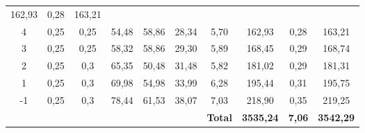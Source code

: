 \documentclass[letterpaper,11pt]{article} %
\begin{document}
\begin{itemize}
\begin{table}[H]
{\begin{tabular}{cccccc|c|c|c|c|}
              162,93 &
              0,28 &
              163,21
              \\
            \multicolumn{1}{|c|}{4} &
              \multicolumn{1}{c|}{0,25} &
              \multicolumn{1}{c|}{0,25} &
              \multicolumn{1}{c|}{54,48} &
              \multicolumn{1}{c|}{58,86} &
              28,34 &
              5,70 &
              162,93 &
              0,28 &
              163,21
              \\
            \multicolumn{1}{|c|}{3} &
              \multicolumn{1}{c|}{0,25} &
              \multicolumn{1}{c|}{0,25} &
              \multicolumn{1}{c|}{58,32} &
              \multicolumn{1}{c|}{58,86} &
              29,30 &
              5,89 &
              168,45 &
              0,29 &
              168,74
              \\
            \multicolumn{1}{|c|}{2} &
              \multicolumn{1}{c|}{0,25} &
              \multicolumn{1}{c|}{0,3} &
              \multicolumn{1}{c|}{65,35} &
              \multicolumn{1}{c|}{50,48} &
              31,48 &
              5,82 &
              181,02 &
              0,29 &
              181,31
              \\
            \multicolumn{1}{|c|}{1} &
              \multicolumn{1}{c|}{0,25} &
              \multicolumn{1}{c|}{0,3} &
              \multicolumn{1}{c|}{69,98} &
              \multicolumn{1}{c|}{54,98} &
              33,99 &
              6,28 &
              195,44 &
              0,31 &
              195,75
              \\
            \multicolumn{1}{|c|}{-1} &
              \multicolumn{1}{c|}{0,25} &
              \multicolumn{1}{c|}{0,3} &
              \multicolumn{1}{c|}{78,44} &
              \multicolumn{1}{c|}{61,53} &
              38,07 &
              7,03 &
              218,90 &
              0,35 &
              219,25
              \bigstrut[b]\\
            \hline
             &
               &
               &
               &
               &
               &
              \textbf{Total} &
              \textbf{3535,24} &
              \textbf{7,06} &
              \textbf{3542,29}
              \bigstrut\\
        \cline{7-10}    \end{tabular}}%
          \label{muros}%
        \end{table}%


\end{itemize}
\end{document}
